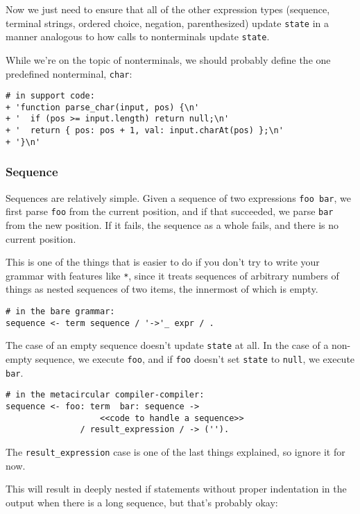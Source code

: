 \documentclass[
]{article}
\begin{document}
Now we just need to ensure that all of the other expression types
(sequence, terminal strings, ordered choice, negation, parenthesized)
update \texttt{state} in a manner analogous to how calls to nonterminals
update \texttt{state}.

While we're on the topic of nonterminals, we should probably define the
one predefined nonterminal, \texttt{char}:

\begin{verbatim}
# in support code:
+ 'function parse_char(input, pos) {\n'
+ '  if (pos >= input.length) return null;\n'
+ '  return { pos: pos + 1, val: input.charAt(pos) };\n'
+ '}\n'
\end{verbatim}

\hypertarget{sequence}{%
\subsubsection{Sequence}\label{sequence}}

Sequences are relatively simple. Given a sequence of two expressions
\texttt{foo\ bar}, we first parse \texttt{foo} from the current
position, and if that succeeded, we parse \texttt{bar} from the new
position. If it fails, the sequence as a whole fails, and there is no
current position.

This is one of the things that is easier to do if you don't try to write
your grammar with features like \texttt{*}, since it treats sequences of
arbitrary numbers of things as nested sequences of two items, the
innermost of which is empty.

\begin{verbatim}
# in the bare grammar:
sequence <- term sequence / '->'_ expr / .
\end{verbatim}

The case of an empty sequence doesn't update \texttt{state} at all. In
the case of a non-empty sequence, we execute \texttt{foo}, and if
\texttt{foo} doesn't set \texttt{state} to \texttt{null}, we execute
\texttt{bar}.

\begin{verbatim}
# in the metacircular compiler-compiler:
sequence <- foo: term  bar: sequence -> 
                   <<code to handle a sequence>>
               / result_expression / -> ('').
\end{verbatim}

The \texttt{result\_expression} case is one of the last things
explained, so ignore it for now.

This will result in deeply nested if statements without proper
indentation in the output when there is a long sequence, but that's
probably okay:
\end{document}
